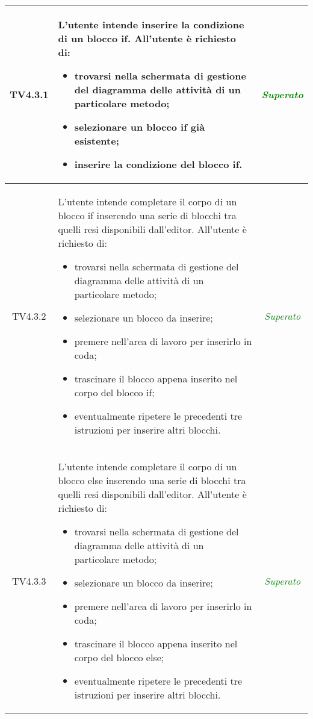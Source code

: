 \begin{longtable}{|c|>{}m{8cm}|c|}
\hypertarget{TV4.3.1}{TV4.3.1} & L'utente intende inserire la condizione di un blocco if.
All'utente è richiesto di:
\begin{itemize}
	\item trovarsi nella schermata di gestione del diagramma delle attività di un particolare metodo;
	\item selezionare un blocco if già esistente;
	\item inserire la condizione del blocco if.
\end{itemize} & \textcolor{Green}{\textit{Superato}}\\ \hline

\hypertarget{TV4.3.2}{TV4.3.2} & L'utente intende completare il corpo di un blocco if inserendo una serie di blocchi tra quelli resi disponibili dall'editor.
All'utente è richiesto di:
\begin{itemize}
	\item trovarsi nella schermata di gestione del diagramma delle attività di un particolare metodo;
	\item selezionare un blocco da inserire;
	\item premere nell'area di lavoro per inserirlo in coda;
	\item trascinare il blocco appena inserito nel corpo del blocco if;
	\item eventualmente ripetere le precedenti tre istruzioni per inserire altri blocchi.
\end{itemize} & \textcolor{Green}{\textit{Superato}}\\ \hline

\hypertarget{TV4.3.3}{TV4.3.3} & L'utente intende completare il corpo di un blocco else inserendo una serie di blocchi tra quelli resi disponibili dall'editor.
All'utente è richiesto di:
\begin{itemize}
	\item trovarsi nella schermata di gestione del diagramma delle attività di un particolare metodo;
	\item selezionare un blocco da inserire;
	\item premere nell'area di lavoro per inserirlo in coda;
	\item trascinare il blocco appena inserito nel corpo del blocco else;
	\item eventualmente ripetere le precedenti tre istruzioni per inserire altri blocchi.
\end{itemize} & \textcolor{Green}{\textit{Superato}}\\ \hline


\end{longtable}
